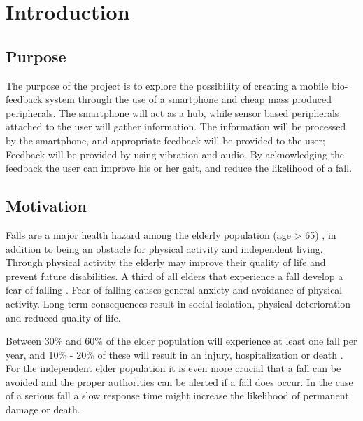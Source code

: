 \chapter{Introduction}

\section{Purpose}
The purpose of the project is to explore the possibility of creating a mobile bio-feedback system through the use of a smartphone and cheap mass produced peripherals. The smartphone will act as a hub, while sensor based peripherals attached to the user will gather information. The information will be processed by the smartphone, and appropriate feedback will be provided to the user; Feedback will be provided by using vibration and audio. By acknowledging the feedback the user can improve his or her gait, and reduce the likelihood of a fall.

\section{Motivation}
Falls are a major health hazard among the elderly population (age > 65) \cite{fallsHealthHazard}, in addition to being an obstacle for physical activity and independent living. Through physical activity the elderly may improve their quality of life and prevent future disabilities\cite{physicalActivity}. A third of all elders that experience a fall develop a fear of falling \cite{fearOfFalling}. Fear of falling causes general anxiety and avoidance of physical activity. Long term consequences result in social isolation, physical deterioration and reduced quality of life.\cite{physicalAvoidance} %

Between 30\% and 60\% of the elder population will experience at least one fall per year, and 10\% - 20\% of these will result in an injury, hospitalization or death \cite{fallStatistics}. For the independent elder population it is even more crucial that a fall can be avoided and the proper authorities can be alerted if a fall does occur. In the case of a serious fall a slow response time might increase the likelihood of permanent damage or death\cite{personHomeDeath, dangerousFallHome}.


